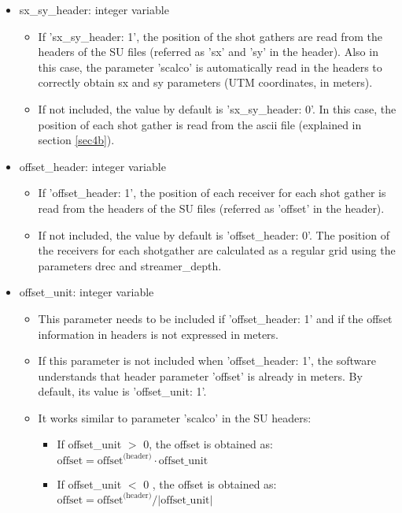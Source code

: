 \documentclass[11pt, oneside]{article}   	%
\begin{document}
\begin{itemize}
\item  sx\_sy\_header: integer variable 
	\begin{itemize}
	\item If 'sx\_sy\_header:  1', the position of the shot gathers are read from the headers of the SU files (referred as 'sx' and 'sy' in the header). Also in this case, the parameter 'scalco' is automatically read in the headers to correctly obtain sx and sy parameters (UTM coordinates, in meters).
	\item If not included, the value by default is 'sx\_sy\_header:  0'. In this case, the position of each shot gather is read from the ascii file (explained in section \ref{sec4b}).
	\end{itemize}

\item  offset\_header: integer variable 
	\begin{itemize}
	\item If 'offset\_header:  1', the position of each receiver for each shot gather is read from the headers of the SU files (referred as 'offset' in the header).
	\item If not included, the value by default is 'offset\_header:  0'. The position of the receivers for each shotgather are calculated as a regular grid using the parameters {drec} and streamer\_depth.
	\end{itemize}

\item  offset\_unit: integer variable
	\begin{itemize}
	\item This parameter needs to be included if 'offset\_header: 1' and if the offset information in headers is not expressed in meters.
	\item If this parameter is not included when 'offset\_header: 1', the software understands that header parameter 'offset' is already in meters. By default, its value is 'offset\_unit: 1'.
	\item It works similar to parameter 'scalco' in the SU headers:
		\begin{itemize}
		\item If offset\_unit $>$ 0, the offset is obtained as:
		$ \text{offset} = \text{offset}^ \text{(header)} \cdot \text{offset\_unit}$
		\item If offset\_unit $<$ 0 , the offset is obtained as:
		$ \text{offset} = \text{offset}^ \text{(header)} / | \text{offset\_unit} |$ 
	\end{itemize}
	

\end{itemize}
\end{itemize}
\end{document}
